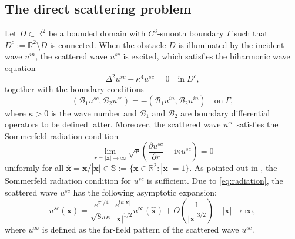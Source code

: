 \documentclass[10pt,a4paper]{article}
\numberwithin{equation}{section}
\begin{document}
\subsection{The direct scattering problem}
\label{direct}
Let $D\subset\mathbb{R}^2$ be a bounded domain with $C^3$-smooth boundary $\Gamma$ such that $D^{c}:=\mathbb{R}^2\setminus\overline{D}$ is connected.  When the obstacle $D$ is illuminated by the incident wave $u^{in}$, the scattered wave $u^{sc}$ is excited, which satisfies the biharmonic wave equation 
\begin{equation}
\label{eq:bi}
\Delta^2u^{sc}-\kappa^4u^{sc}=0 \quad\mathrm{in}\; D^{c},
\end{equation}
together with the  boundary conditions
\begin{equation}
\label{eq:boundary}
(\mathcal{B}_1u^{sc},\mathcal{B}_2u^{sc}) = 
-(\mathcal{B}_1u^{in},\mathcal{B}_2u^{in}) \quad\mathrm{on}\;\Gamma,
\end{equation}
where $\kappa>0$ is the wave number and $\mathcal{B}_1$ and $\mathcal{B}_2$ are boundary differential operators to be defined latter. 
 Moreover, the scattered wave $u^{sc}$ satisfies the Sommerfeld radiation condition
\begin{equation}
\label{eq:radiation}
\lim\limits_{r=|\bm{x}|\to\infty}\sqrt{r}\left(\frac{\partial u^{sc}}{\partial r}
  -\mathrm{i}\kappa u^{sc}\right)=0
\end{equation}
uniformly for all $\hat{\bm x}=\bm{x}/|\bm{x|}\in\mathbb{S}:=\{\bm{x}\in\mathbb{R}^2:|\bm{x}|=1\}$.
As pointed out in \cite{bourgeois_well_2020}, the Sommerfeld radiation condition for $u^{sc}$ is sufficient. Due to \eqref{eq:radiation},
the scattered wave $u^{sc}$ has the following asymptotic expansion:
\begin{equation}
  \label{eq:asy}
  u^{sc}(\bm{x}) = \dfrac{e^{\pi \mathrm{i}/4}}{\sqrt{8\pi\kappa}}
  \dfrac{e^{\mathrm{i}\kappa|\bm{x}|}}{|\bm{x}|^{1/2}}
u^{\infty}(\hat{\bm{x}}) + O\left(\dfrac{1}{|\bm{x}|^{3/2}} \right) \quad |\bm{x}|\to\infty,
\end{equation}
where $u^{\infty}$ is defined as the far-field pattern of the scattered wave $u^{sc}$.
\end{document}
